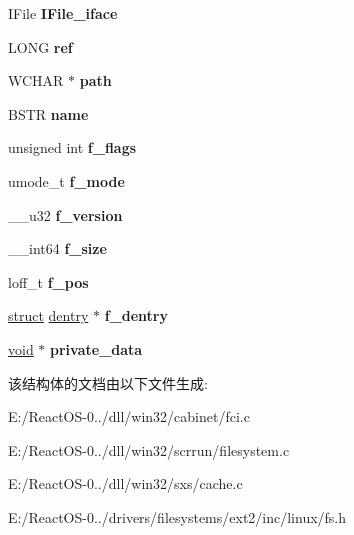 \begin{DoxyCompactItemize}
I\+File {\bfseries I\+File\+\_\+iface}
\item 
\mbox{\label{structfile_ab171c08a135f4c974bf866e9aa01faff}} 
L\+O\+NG {\bfseries ref}
\item 
\mbox{\label{structfile_a5b379899e60ba12fd09b9272ed8aec17}} 
W\+C\+H\+AR $\ast$ {\bfseries path}
\item 
\mbox{\label{structfile_afb1fa0fd24fbd7f57ea89a2a5ffff1a8}} 
B\+S\+TR {\bfseries name}
\item 
\mbox{\label{structfile_ad12c5acc13019350de03b75a2d446430}} 
unsigned int {\bfseries f\+\_\+flags}
\item 
\mbox{\label{structfile_aa3377186a4b5771974063d29c672d6a9}} 
umode\+\_\+t {\bfseries f\+\_\+mode}
\item 
\mbox{\label{structfile_a300661867da09a9304b54f07fac3e444}} 
\+\_\+\+\_\+u32 {\bfseries f\+\_\+version}
\item 
\mbox{\label{structfile_aa4a0c747bd69191f5bb5bb01e5d4695d}} 
\+\_\+\+\_\+int64 {\bfseries f\+\_\+size}
\item 
\mbox{\label{structfile_a4e4bbc3fbb882f9622268d5dfb50e666}} 
loff\+\_\+t {\bfseries f\+\_\+pos}
\item 
\mbox{\label{structfile_aef71e7dca74ed03d3485d8f033d29555}} 
\hyperlink{interfacestruct}{struct} \hyperlink{structdentry}{dentry} $\ast$ {\bfseries f\+\_\+dentry}
\item 
\mbox{\label{structfile_a6705089e159076aa1fd22e919bccf2f1}} 
\hyperlink{interfacevoid}{void} $\ast$ {\bfseries private\+\_\+data}
\end{DoxyCompactItemize}


该结构体的文档由以下文件生成\+:\begin{DoxyCompactItemize}
\item 
E\+:/\+React\+O\+S-\/0../dll/win32/cabinet/fci.\+c\item 
E\+:/\+React\+O\+S-\/0../dll/win32/scrrun/filesystem.\+c\item 
E\+:/\+React\+O\+S-\/0../dll/win32/sxs/cache.\+c\item 
E\+:/\+React\+O\+S-\/0../drivers/filesystems/ext2/inc/linux/fs.\+h\end{DoxyCompactItemize}
